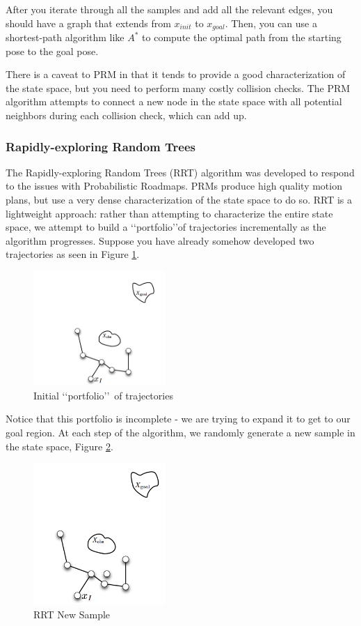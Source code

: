 \documentclass[twoside]{article}
\begin{document}
After you iterate through all the samples and add all the relevant edges, you should have a graph that extends from $x_{init}$ to $x_{goal}$. Then, you can use a shortest-path algorithm like $A^*$ to compute the optimal path from the starting pose to the goal pose. 

There is a caveat to PRM in that it tends to provide a good characterization of the state space, but you need to perform many costly collision checks. The PRM algorithm attempts to connect a new node in the state space with all potential neighbors during each collision check, which can add up. 

\subsubsection{Rapidly-exploring Random Trees}
The Rapidly-exploring Random Trees (RRT) algorithm was developed to respond to the issues with Probabilistic Roadmaps. PRMs produce high quality motion plans, but use a very dense characterization of the state space to do so. RRT is a lightweight approach: rather than attempting to characterize the entire state space, we attempt to build a \lq\lq portfolio\rq\rq of trajectories incrementally as the algorithm progresses. Suppose you have already somehow developed two trajectories as seen in Figure \ref{fig:rrt_portfolio}. 

\begin{figure}[h!]
  \centering
  \includegraphics[width=50mm]{rrt_portfolio_of_trajectories.png}
  \caption{Initial \lq\lq portfolio\rq\rq\ of trajectories}
  \label{fig:rrt_portfolio}
\end{figure}

Notice that this portfolio is incomplete - we are trying to expand it to get to our goal region. At each step of the algorithm, we randomly generate a new sample in the state space, Figure \ref{fig:rrt_new_sample}.

\begin{figure}[h!]
  \centering
  \includegraphics[width=50mm]{rrt_new_sample.png}
  \caption{RRT New Sample}
  \label{fig:rrt_new_sample}
\end{figure}
\end{document}
